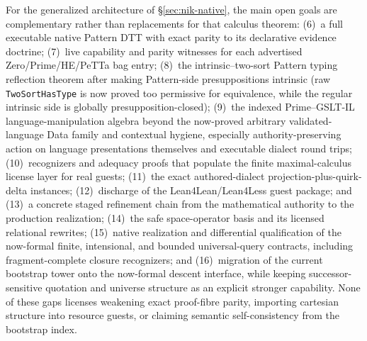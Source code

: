 \documentclass[11pt]{article}
\newcommand{\code}[1]{\texttt{#1}}
\begin{document}
For the generalized architecture of \S\ref{sec:nik-native}, the main open goals
are complementary rather than replacements for that calculus theorem:
(6)~a full executable native Pattern DTT with exact parity to its declarative
evidence doctrine; (7)~live capability and parity witnesses for each advertised
Zero/Prime/HE/PeTTa bag entry; (8)~the intrinsic--two-sort Pattern typing
reflection theorem after making Pattern-side presuppositions intrinsic (raw
\code{TwoSortHasType} is now proved too permissive for equivalence, while the regular
intrinsic side is globally presupposition-closed); (9)~the indexed Prime--GSLT-IL
language-manipulation algebra beyond the now-proved arbitrary validated-language
Data family and contextual hygiene, especially authority-preserving action on
language presentations themselves and executable dialect round trips;
(10)~recognizers and adequacy proofs that populate the finite maximal-calculus
license layer for real guests; (11)~the exact authored-dialect
projection-plus-quirk-delta instances; (12)~discharge of the Lean4Lean/Lean4Less
guest package; and (13)~a concrete staged refinement chain from the mathematical
authority to the production realization; (14)~the safe space-operator basis and
its licensed relational rewrites; (15)~native realization and differential
qualification of the now-formal finite, intensional, and bounded universal-query
contracts, including fragment-complete closure recognizers; and
(16)~migration of the current bootstrap tower onto the now-formal descent
interface, while keeping successor-sensitive quotation and universe structure as
an explicit stronger capability.  None of these gaps licenses weakening exact proof-fibre
parity, importing cartesian structure into resource guests, or claiming semantic
self-consistency from the bootstrap index.
\end{document}
